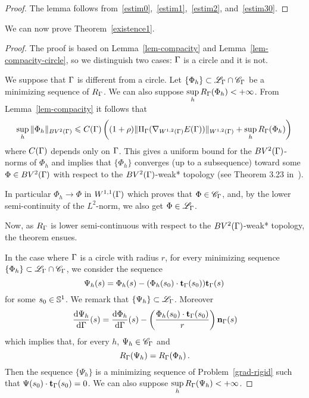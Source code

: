 \begin{proof}
The lemma follows from~\eqref{estim0},~\eqref{estim1},~\eqref{estim2}, and~\eqref{estim30}.
\end{proof}

We can now prove Theorem~\ref{existence1}.

\begin{proof} The proof is based on Lemma~\ref{lem-compacity} and Lemma~\ref{lem-compacity-circle}, so we distinguish two cases: $\Gamma$ is a circle and it is not.
\par We suppose that $\Gamma$ is different from a circle. Let $\{\Phi_h\}\subset \mathcal{L}_\Gamma \cap \mathcal{C}_\Gamma$ be a minimizing sequence of  $R_\Gamma$. We can also suppose $\underset{h}{\sup}\,	R_\Gamma(\Phi_h)< +\infty$.
From Lemma~\ref{lem-compacity} it follows that 
$$
\underset{h}{\sup}\,	\|  \Phi_h  \|_{BV^{2}(\Gamma)} \leqslant 
		C(\Gamma)\left( (1+\rho) \|\Pi_\Gamma(\nabla_{W^{1,2}(\Gamma)}E(\Gamma))\|_{W^{1,2}(\Gamma)} +
\underset{h}{\sup}\,R_\Gamma(\Phi_h)\right)\,
$$   
where $C(\Gamma)$ depends only on $\Gamma$.  This gives a uniform bound for the $BV^2(\Gamma)$-norms of $\Phi_h$ and  implies that  $\{\Phi_h\}$  converges (up to a subsequence) toward some  $\Phi \in BV^2(\Gamma)$ with respect to the $BV^2(\Gamma)$-weak* topology (see Theorem 3.23 in~\cite{AFP}). 
\par In particular $\Phi_h \rightarrow \Phi$  in $W^{1,1}(\Gamma)$ which proves that  $\Phi \in \mathcal{C}_\Gamma $, and, by the lower semi-continuity of the $L^2$-norm, we also get  $\Phi \in \mathcal{L}_\Gamma$.
\par Now, as $R_\Gamma$ is lower semi-continuous with respect to the $BV^2(\Gamma)$-weak* topology, the theorem ensues.
\par In the case where $\Gamma$ is a circle with radius $r$, for every minimizing sequence $\{\Phi_h\}\subset \mathcal{L}_\Gamma \cap \mathcal{C}_\Gamma$, we consider the sequence 
\begin{equation}\label{psi-proof}
\Psi_h(s)=\Phi_h(s) - (\Phi_h(s_0)\cdot \mathbf{t}_\Gamma(s_0))\mathbf{t}_\Gamma(s) \,
\end{equation}
for some $s_0\in \mathbb{S}^1$.
We remark that $\{\Psi_h \} \subset  \mathcal{L}_\Gamma$. 
 Moreover 
\begin{equation}\label{phi-psi}
\frac{\mathrm{d}\Psi_h}{\mathrm{d}\Gamma}(s)=\frac{\mathrm{d}\Phi_h}{\mathrm{d}\Gamma}(s)-\left(\frac{\Phi_h(s_0)\cdot \mathbf{t}_\Gamma(s_0)}{r}\right)\mathbf{n}_\Gamma(s)
\end{equation}
which implies that, for every $h$,  $\Psi_h\in \mathcal{C}_\Gamma$ and
\begin{equation}\label{equal-TV}
R_\Gamma(\Psi_h)=R_\Gamma(\Phi_h)\,.
\end{equation}
Then the sequence $\{\Psi_h\}$ is a minimizing sequence of Problem~\eqref{grad-rigid} such that $\Psi(s_0)\cdot\mathbf{t}_\Gamma(s_0)=0$. We can also suppose $\underset{h}{\sup}\,	R_\Gamma(\Psi_h)< +\infty$.


\end{proof}
